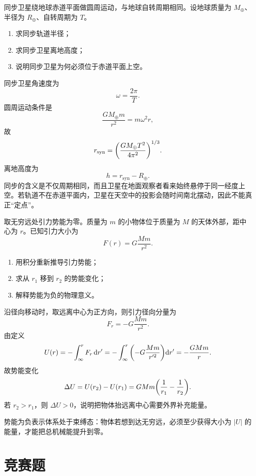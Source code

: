 \begin{classic}
同步卫星绕地球赤道平面做圆周运动，与地球自转周期相同。设地球质量为 $M_\oplus$、半径为 $R_\oplus$、自转周期为 $T$。
\begin{enumerate}
  \item 求同步轨道半径；
  \item 求同步卫星离地高度；
  \item 说明同步卫星为何必须位于赤道平面上空。
\end{enumerate}
\begin{solution}
同步卫星角速度为
\[
\omega=\frac{2\pi}{T}.
\]
圆周运动条件是
\[
\frac{GM_\oplus m}{r^2}=m\omega^2 r,
\]
故
\[
r_{\text{syn}}=\qty(\frac{GM_\oplus T^2}{4\pi^2})^{1/3}.
\]
离地高度为
\[
h=r_{\text{syn}}-R_\oplus.
\]
同步的含义是不仅周期相同，而且卫星在地面观察者看来始终悬停于同一经度上空。若轨道不在赤道平面内，卫星在天空中的投影会随时间南北摆动，因此不能真正“定点”。
\end{solution}
\end{classic}

\begin{classic}
取无穷远处引力势能为零。质量为 $m$ 的小物体位于质量为 $M$ 的天体外部，距中心为 $r$。已知引力大小为
\[
F(r)=G\frac{Mm}{r^2}.
\]
\begin{enumerate}
  \item 用积分重新推导引力势能；
  \item 求从 $r_1$ 移到 $r_2$ 的势能变化；
  \item 解释势能为负的物理意义。
\end{enumerate}
\begin{solution}
沿径向移动时，取远离中心为正方向，则引力径向分量为
\[
F_r=-G\frac{Mm}{r^2}.
\]
由定义
\[
U(r)=-\int_{\infty}^{r} F_r\,\dd r'
=-\int_{\infty}^{r}\qty(-G\frac{Mm}{r'^2})\dd r'=-\frac{GMm}{r}.
\]
故势能变化
\[
\Delta U=U(r_2)-U(r_1)=GMm\qty(\frac{1}{r_1}-\frac{1}{r_2}).
\]
若 $r_2>r_1$，则 $\Delta U>0$，说明把物体抬远离中心需要外界补充能量。

势能为负表示体系处于束缚态：物体若想到达无穷远，必须至少获得大小为 $|U|$ 的能量，才能把总机械能提升到零。
\end{solution}
\end{classic}

\section{竞赛题}

